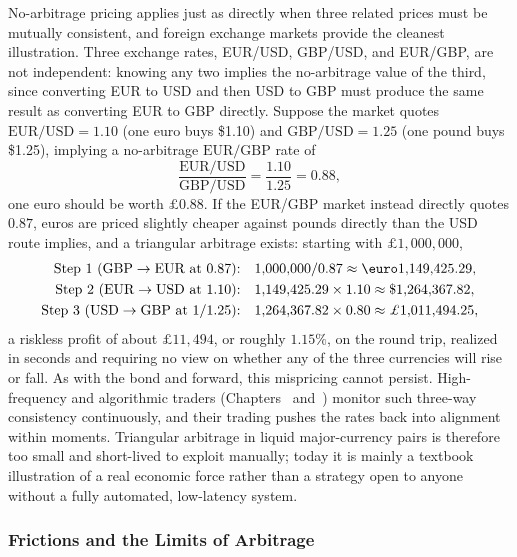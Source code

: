 \documentclass[../ai_in_finance]{subfiles}
\begin{document}
No-arbitrage pricing applies just as directly when three related prices must be mutually consistent, and foreign exchange markets provide the cleanest illustration. Three exchange rates, EUR/USD, GBP/USD, and EUR/GBP, are not independent: knowing any two implies the no-arbitrage value of the third, since converting EUR to USD and then USD to GBP must produce the same result as converting EUR to GBP directly. Suppose the market quotes $\text{EUR/USD} = 1.10$ (one euro buys \$1.10) and $\text{GBP/USD} = 1.25$ (one pound buys \$1.25), implying a no-arbitrage $\text{EUR/GBP}$ rate of
\begin{equation*}
\frac{\text{EUR/USD}}{\text{GBP/USD}} = \frac{1.10}{1.25} = 0.88,
\end{equation*}
one euro should be worth $\pounds0.88$. If the EUR/GBP market instead directly quotes $0.87$, euros are priced slightly cheaper against pounds directly than the USD route implies, and a triangular arbitrage exists: starting with $\pounds1{,}000{,}000$,
\begin{align*}
\text{Step 1 (GBP} \to \text{EUR at } 0.87\text{):} &\quad 1{,}000{,}000 / 0.87 \approx \text{\euro}1{,}149{,}425.29, \\
\text{Step 2 (EUR} \to \text{USD at } 1.10\text{):} &\quad 1{,}149{,}425.29 \times 1.10 \approx \$1{,}264{,}367.82, \\
\text{Step 3 (USD} \to \text{GBP at } 1/1.25\text{):} &\quad 1{,}264{,}367.82 \times 0.80 \approx \pounds1{,}011{,}494.25,
\end{align*}
a riskless profit of about $\pounds11{,}494$, or roughly $1.15\%$, on the round trip, realized in seconds and requiring no view on whether any of the three currencies will rise or fall. As with the bond and forward, this mispricing cannot persist. High-frequency and algorithmic traders (Chapters~ and~) monitor such three-way consistency continuously, and their trading pushes the rates back into alignment within moments. Triangular arbitrage in liquid major-currency pairs is therefore too small and short-lived to exploit manually; today it is mainly a textbook illustration of a real economic force rather than a strategy open to anyone without a fully automated, low-latency system.

\subsubsection*{Frictions and the Limits of Arbitrage}
\end{document}
